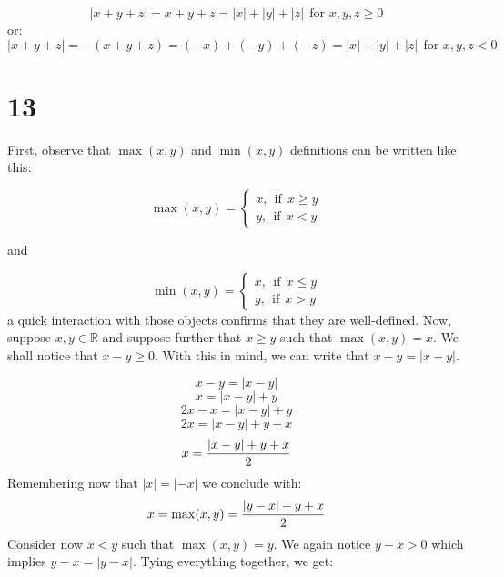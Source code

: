 \documentclass{article}
\begin{document}
\begin{equation*}
	|x  + y + z| = x + y + z = |x| + |y| + |z| \ \ \mbox{for \(x, y ,z \geq 0\)}
\end{equation*}
or:
\begin{equation*}
	|x + y + z| = -(x + y + z) = (-x) + (-y) + (-z) = |x| + |y| + |z| \ \ \mbox{for \(x, y ,z < 0\)}
\end{equation*}


\section*{13}

First, observe that \(\max(x, y)\) and \(\min(x, y)\) definitions can be written like this:

\begin{equation*}
	\max(x, y) = 
	\begin{cases}
	x, \ \ \mbox{if} \ \ x \geq y \\
	y, \ \ \mbox{if} \ \ x < y
	\end{cases}
\end{equation*}

and

\begin{equation*}
	\min(x, y) = 
	\begin{cases}
		x, \ \ \mbox{if} \ \ x \leq y \\
		y, \ \ \mbox{if} \ \ x > y
	\end{cases}
\end{equation*}
a quick interaction with those objects confirms that they are well-defined. Now, suppose
\(x, y \in \mathbb{R}\) and suppose further that \(x \geq y\) such that \(\max(x, y) = x\).
We shall notice that \(x - y \geq 0\). With this in mind, we can write that \(x - y = |x - y|\).


\begin{equation*}
	x - y = |x - y|
\end{equation*}
\begin{equation*}
	x = |x - y| + y
\end{equation*}
\begin{equation*}
	2x - x = |x - y| + y
\end{equation*}
\begin{equation*}
	2x = |x - y| + y + x
\end{equation*}
\begin{equation*}
	x = \frac{\abs{x - y} + y + x}{2}
\end{equation*}
Remembering now that \(|x| = |-x|\) we conclude with:
\begin{equation*}
	x = \max(x, y) = \frac{\abs{y - x} + y + x}{2}
\end{equation*}
Consider now \(x < y\) such that \(\max(x, y) = y\). We again notice \(y - x > 0\) which implies
\(y - x = |y - x|\). Tying everything together, we get:
\end{document}
